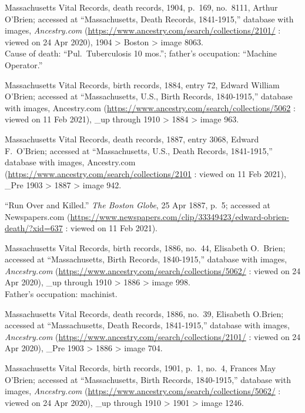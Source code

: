 \begin{thebibliography}{999}
Massachusetts Vital Records, death records, 1904, p.\ 169, no.\ 8111, Arthur O'Brien; accessed at ``Massachusetts, Death Records, 1841-1915,'' database with images, \textit{Ancestry.com} (\url{https://www.ancestry.com/search/collections/2101/} : viewed on 24 Apr 2020), 1904 > Boston > image 8063.\\
Cause of death: ``Pul.\ Tuberculosis 10 mos.''; father's occupation: ``Machine Operator.''

Massachusetts Vital Records, birth records, 1884, entry 72, Edward William O'Brien; accessed at ``Massachusetts, U.S., Birth Records, 1840-1915,'' database with images, Ancestry.com (\url{https://www.ancestry.com/search/collections/5062} : viewed on 11 Feb 2021), \_up through 1910 > 1884 > image 963.

Massachusetts Vital Records, death records, 1887, entry 3068, Edward F.\ O'Brien; accessed at ``Massachusetts, U.S., Death Records, 1841-1915,'' database with images, Ancestry.com (\url{https://www.ancestry.com/search/collections/2101} : viewed on 11 Feb 2021), \_Pre 1903 > 1887 > image 942.

``Run Over and Killed.'' \textit{The Boston Globe}, 25 Apr 1887, p.\ 5; accessed at Newspapers.com (\url{https://www.newspapers.com/clip/33349423/edward-obrien-death/?xid=637} : viewed on 11 Feb 2021).

Massachusetts Vital Records, birth records, 1886, no.\ 44, Elisabeth O.\ Brien; accessed at ``Massachusetts, Birth Records, 1840-1915,'' database with images, \textit{Ancestry.com} (\url{https://www.ancestry.com/search/collections/5062/} : viewed on 24 Apr 2020), \_up through 1910 > 1886 > image 998.\\
Father's occupation: machinist.

Massachusetts Vital Records, death records, 1886, no.\ 39, Elisabeth O.Brien; accessed at ``Massachusetts, Death Records, 1841-1915,'' database with images, \textit{Ancestry.com} (\url{https://www.ancestry.com/search/collections/2101/} : viewed on 24 Apr 2020), \_Pre 1903 > 1886 > image 704.

Massachusetts Vital Records, birth records, 1901, p.\ 1, no.\ 4, Frances May O'Brien; accessed at ``Massachusetts, Birth Records, 1840-1915,'' database with images, \textit{Ancestry.com} (\url{https://www.ancestry.com/search/collections/5062/} : viewed on 24 Apr 2020), \_up through 1910 > 1901 > image 1246.


\end{thebibliography}
